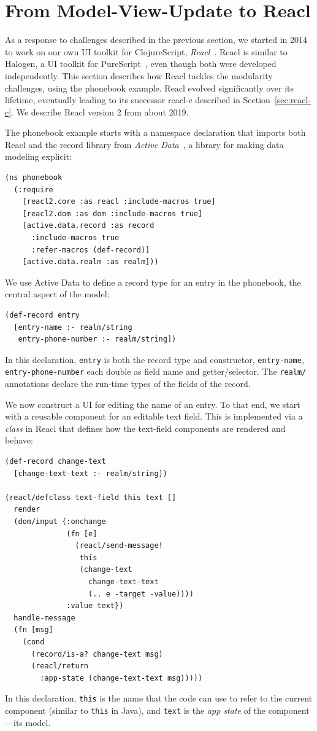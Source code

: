 \documentclass[sigplan,screen]{acmart}
\begin{document}
\section{From Model-View-Update to Reacl}
\label{sec:reacl}

As a response to challenges described in the previous section, we
started in 2014 to work on our own UI toolkit for ClojureScript,
\textit{Reacl}~\cite{Reacl}.  Reacl is similar to Halogen, a UI
toolkit for PureScript~\cite{Halogen}, even though both were developed
independently.
This section describes how Reacl tackles
the modularity challenges, using the phonebook example.  Reacl evolved
significantly over its lifetime, eventually leading to its successor
reacl-c described in Section~\ref{sec:reacl-c}.  We describe Reacl version 2
from about 2019.

The phonebook example starts with a namespace declaration that imports
both Reacl and the record library from \textit{Active
  Data}~\cite{ActiveData}, a library for making data modeling
explicit:
%
\begin{verbatim}
(ns phonebook
  (:require
    [reacl2.core :as reacl :include-macros true]
    [reacl2.dom :as dom :include-macros true]
    [active.data.record :as record
      :include-macros true
      :refer-macros (def-record)]
    [active.data.realm :as realm]))
\end{verbatim}
%
We use Active Data to define a record type for an entry in the
phonebook, the central aspect of the model:
%
\begin{verbatim}
(def-record entry
  [entry-name :- realm/string
   entry-phone-number :- realm/string])
\end{verbatim}
%
In this declaration, \texttt{entry} is both the record type and
constructor, \texttt{entry-name},
\texttt{entry-phone-number} each double as field name and
getter/selector.  The \texttt{realm/} annotations declare the run-time
types of the fields of the record.

We now construct a UI for editing the name of an entry.  To that end,
we start with a reusable component for an editable text field.  This
is implemented via a \textit{class} in Reacl that defines how the
text-field components are rendered and behave:
%
\begin{verbatim}
(def-record change-text
  [change-text-text :- realm/string])

(reacl/defclass text-field this text []
  render
  (dom/input {:onchange 
              (fn [e]
                (reacl/send-message!
                 this
                 (change-text
                   change-text-text
                   (.. e -target -value))))
              :value text})
  handle-message
  (fn [msg]
    (cond
      (record/is-a? change-text msg)
      (reacl/return
        :app-state (change-text-text msg)))))
\end{verbatim}
%
In this declaration, \texttt{this} is the name that the code can use
to refer to the current component (similar to \texttt{this} in Java),
and \texttt{text} is the \textit{app state} of the component---its
model.
\end{document}
